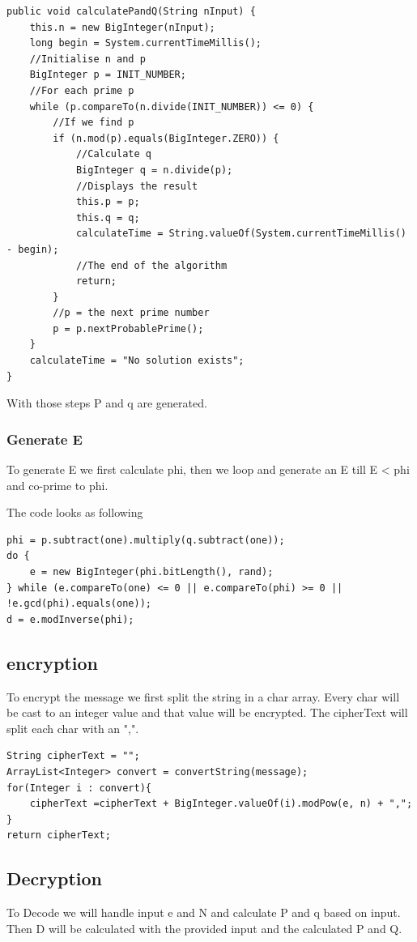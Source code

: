 \begin{lstlisting}
public void calculatePandQ(String nInput) {
    this.n = new BigInteger(nInput);
    long begin = System.currentTimeMillis();
    //Initialise n and p
    BigInteger p = INIT_NUMBER;
    //For each prime p
    while (p.compareTo(n.divide(INIT_NUMBER)) <= 0) {
        //If we find p
        if (n.mod(p).equals(BigInteger.ZERO)) {
            //Calculate q
            BigInteger q = n.divide(p);
            //Displays the result
            this.p = p;
            this.q = q;
            calculateTime = String.valueOf(System.currentTimeMillis() - begin);
            //The end of the algorithm
            return;
        }
        //p = the next prime number
        p = p.nextProbablePrime();
    }
    calculateTime = "No solution exists";
}
\end{lstlisting}

With those steps P and q are generated.

\subsubsection{Generate E}
To generate E we first calculate phi, then we loop and generate an E till E  < phi and co-prime to phi.

The code looks as following
\begin{lstlisting}  
phi = p.subtract(one).multiply(q.subtract(one));
do {
    e = new BigInteger(phi.bitLength(), rand);
} while (e.compareTo(one) <= 0 || e.compareTo(phi) >= 0 || !e.gcd(phi).equals(one));
d = e.modInverse(phi);
\end{lstlisting}{}

\subsection{encryption}
To encrypt the message we first split the string in a char array.
Every char will be cast to an integer value and that value will be encrypted.
The cipherText will split each char with an ",".

\begin{lstlisting}
String cipherText = "";
ArrayList<Integer> convert = convertString(message);
for(Integer i : convert){
    cipherText =cipherText + BigInteger.valueOf(i).modPow(e, n) + ",";
}
return cipherText;
\end{lstlisting}{}


\subsection{Decryption}
To Decode we will handle input e and N and calculate P and q based on input.
Then D will be calculated with the provided input and the calculated P and Q.

